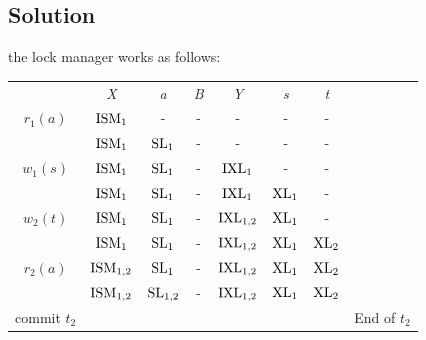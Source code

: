 \subsection*{Solution}
the lock manager works as follows: 
\begin{table}[H]
    \centering
    \begin{tabular}{c|cccccc|c}
    \cline{2-7}
    \textit{}                          & \textit{X}               & \textit{a}              & \textit{B} & \textit{Y}               & \textit{s}          & \textit{t}          & \textit{}    \\ \cline{1-7}
    \multicolumn{1}{|c|}{$r_1(a)$}     & $\textnormal{ISM}_1$     & -                       & -          & -                        & -                   & -                   &              \\
    \multicolumn{1}{|c|}{}             & $\textnormal{ISM}_1$     & $\textnormal{SL}_1$     & -          & -                        & -                   & -                   &              \\
    \multicolumn{1}{|c|}{$w_1(s)$}     & $\textnormal{ISM}_1$     & $\textnormal{SL}_1$     & -          & $\textnormal{IXL}_1$     & -                   & -                   &              \\
    \multicolumn{1}{|c|}{}             & $\textnormal{ISM}_1$     & $\textnormal{SL}_1$     & -          & $\textnormal{IXL}_1$     & $\textnormal{XL}_1$ & -                   &              \\
    \multicolumn{1}{|c|}{$w_2(t)$}     & $\textnormal{ISM}_1$     & $\textnormal{SL}_1$     & -          & $\textnormal{IXL}_{1,2}$ & $\textnormal{XL}_1$ & -                   &              \\
    \multicolumn{1}{|c|}{}             & $\textnormal{ISM}_1$     & $\textnormal{SL}_1$     & -          & $\textnormal{IXL}_{1,2}$ & $\textnormal{XL}_1$ & $\textnormal{XL}_2$ &              \\
    \multicolumn{1}{|c|}{$r_2(a)$}     & $\textnormal{ISM}_{1,2}$ & $\textnormal{SL}_1$     & -          & $\textnormal{IXL}_{1,2}$ & $\textnormal{XL}_1$ & $\textnormal{XL}_2$ &              \\
    \multicolumn{1}{|c|}{}             & $\textnormal{ISM}_{1,2}$ & $\textnormal{SL}_{1,2}$ & -          & $\textnormal{IXL}_{1,2}$ & $\textnormal{XL}_1$ & $\textnormal{XL}_2$ &              \\
    \multicolumn{1}{|c|}{commit $t_2$} &                          &                         &            &                          &                     &                     & End of $t_2$ \\

\end{tabular}
\end{table}
